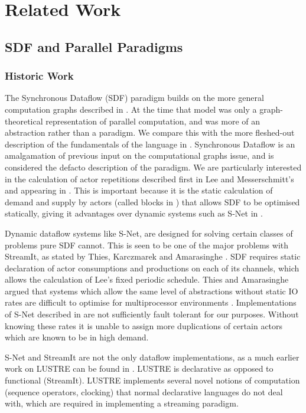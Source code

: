 \chapter{Related Work}
\label{chapRelated}

\section{SDF and Parallel Paradigms}

\subsection{Historic Work}

The Synchronous Dataflow (SDF) paradigm builds on the more general computation graphs described in \cite{kar66}.
At the time that model was only a graph-theoretical representation of parallel computation, and was more of an abstraction rather than a paradigm.
We compare this with the more fleshed-out description of the fundamentals of the language in \cite{sdfBook}.
Synchronous Dataflow is an amalgamation of previous input on the computational graphs issue, and is considered the defacto description of the paradigm.
We are particularly interested in the calculation of actor repetitions described first in Lee and Messerschmitt's \cite{lee87} and appearing in \cite{sdfBook}.
This is important because it is the static calculation of demand and supply by actors (called blocks in \cite{lee87}) that allows SDF to be optimised statically, giving it advantages over dynamic systems such as S-Net in \cite{pen09}.

Dynamic dataflow systems like S-Net, are designed for solving certain classes of problems pure SDF cannot.
This is seen to be one of the major problems with StreamIt, as stated by Thies, Karczmarek and Amarasinghe \cite{thies02}.
SDF requires static declaration of actor consumptions and productions on each of its channels, which allows the calculation of Lee's fixed periodic schedule.
Thies and Amarasinghe argued that systems which allow the same level of abstractions without static IO rates are difficult to optimise for multiprocessor environments \cite{thies10}.
Implementations of S-Net described in \cite{pen09} are not sufficiently fault tolerant for our purposes.
Without knowing these rates it is unable to assign more duplications of certain actors which are known to be in high demand.

S-Net and StreamIt are not the only dataflow implementations, as a much earlier work on LUSTRE can be found in \cite{cas87}.
LUSTRE is declarative as opposed to functional (StreamIt).
LUSTRE implements several novel notions of computation (sequence operators, clocking) that normal declarative languages do not deal with, which are required in implementing a streaming paradigm.

